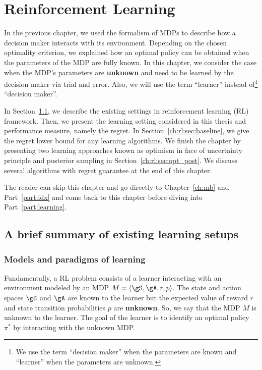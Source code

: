 \begingroup

\let\clearpage\relax

\chapter{Reinforcement Learning}
\label{ch:rl}


In the previous chapter, we used the formalism of MDPs to describe how a decision maker interacts with its environment.
Depending on the chosen optimality criterion, we explained how an optimal policy can be obtained when the parameters of the MDP are fully known.
In this chapter, we consider the case when the MDP's parameters are \textbf{unknown} and need to be learned by the decision maker via trial and error.
Also, we will use the term ``learner'' instead of\footnote{We use the term ``decision maker'' when the parameters are known and ``learner'' when the parameters are unknown.} ``decision maker''.

In Section~\ref{ch:rl:sec:overal}, we describe the existing settings in reinforcement learning (RL) framework.
Then, we present the learning setting considered in this thesis and performance measure, namely the regret. 
In Section~\ref{ch:rl:sec:baseline}, we give the regret lower bound for any learning algorithms.
We finish the chapter by presenting two learning approaches known as optimism in face of uncertainty principle and posterior sampling in Section~\ref{ch:rl:sec:opt_post}.
We discuss several algorithms with regret guarantee at the end of this chapter.

The reader can skip this chapter and go directly to Chapter~\ref{ch:mb} and Part~\ref{part:idx} and come back to this chapter before diving into Part~\ref{part:learning}.

\section{A brief summary of existing learning setups}
\label{ch:rl:sec:overal}

\subsection{Models and paradigms of learning}

Fundamentally, a RL problem consists of a learner interacting with an environment modeled by an MDP $M=\langle\gS,\gA,r,p\rangle$.
The state and action spaces $\gS$ and $\gA$ are known to the learner but the expected value of reward $r$ and state transition probabilities $p$ are \textbf{unknown}.
So, we say that the MDP $M$ is unknown to the learner.
The goal of the learner is to identify an optimal policy $\pi^*$ by interacting with the unknown MDP.

